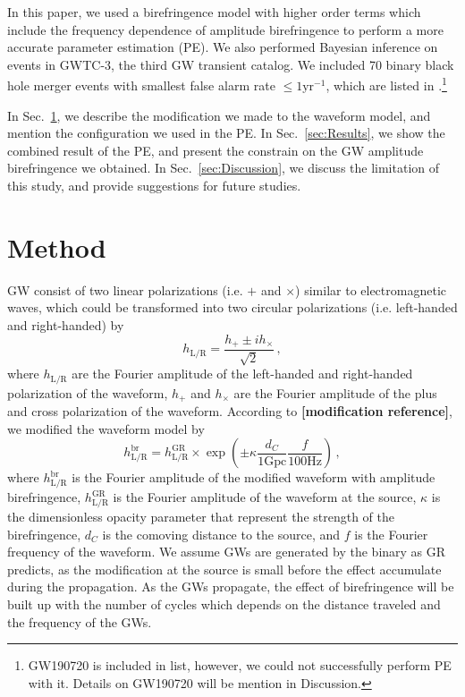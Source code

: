 \documentclass[reprint,amsmath,amssymb,aps,twocolumn]{aastex631}
\begin{document}
In this paper, we used a birefringence model with higher order terms which include the frequency dependence of amplitude birefringence to perform a more accurate parameter estimation (PE).
We also performed Bayesian inference on events in GWTC-3, the third GW transient catalog.
We included 70 binary black hole merger events with smallest false alarm rate $\leq1\mathrm{yr^{-1}}$, which are listed in \citet{GWTC_3_population}.\footnote{GW190720 is included in list, however, we could not successfully perform PE with it. Details on GW190720 will be mention in Discussion.}

In Sec.~\ref{sec:Method}, we describe the modification we made to the waveform model, and mention the configuration we used in the PE.
In Sec.~\ref{sec:Results}, we show the combined result of the PE, and present the constrain on the GW amplitude birefringence we obtained.
In Sec.~\ref{sec:Discussion}, we discuss the limitation of this study, and provide suggestions for future studies.

\section{Method}
\label{sec:Method}

GW consist of two linear polarizations (i.e. $+$ and $\times$) similar to electromagnetic waves, which could be transformed into two circular polarizations (i.e. left-handed and right-handed) by
\begin{equation}
    h_{\mathrm{L/R}} = \frac{h_+ \pm i h_\times}{\sqrt{2}}\,,
\end{equation}
where $h_{\mathrm{L/R}}$ are the Fourier amplitude of the left-handed and right-handed polarization of the waveform, $h_+$ and $h_\times$ are the Fourier amplitude of the plus and cross polarization of the waveform.
According to \textbf{[modification reference]}, we modified the waveform model by
\begin{equation}
    h_\mathrm{L/R}^{\mathrm{br}}=
    h_\mathrm{L/R}^{\mathrm{GR}}\times
    \exp\left(\pm\kappa\frac{d_C}{1\mathrm{Gpc}}\frac{f}{100\mathrm{Hz}}\right)\,,
\end{equation}
where $h_\mathrm{L/R}^{\mathrm{br}}$ is the Fourier amplitude of the modified waveform with amplitude birefringence, $h_\mathrm{L/R}^{\mathrm{GR}}$ is the Fourier amplitude of the waveform at the source, $\kappa$ is the dimensionless opacity parameter that represent the strength of the birefringence, $d_C$ is the comoving distance to the source, and $f$ is the Fourier frequency of the waveform.
We assume GWs are generated by the binary as GR predicts, as the modification at the source is small before the effect accumulate during the propagation.
As the GWs propagate, the effect of birefringence will be built up with the number of cycles which depends on the distance traveled and the frequency of the GWs.
\end{document}
